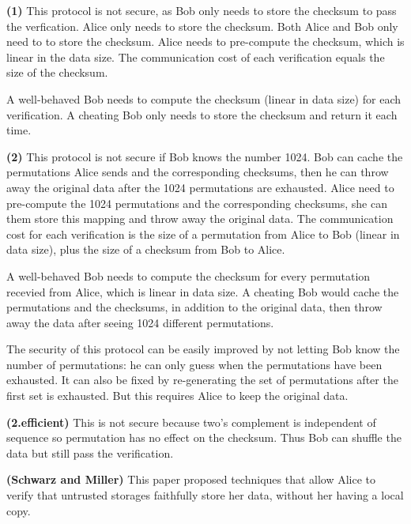 \documentclass[10pt]{article}
\renewcommand\part[1]{\vspace{.10in}\textbf{(#1)}}
\begin{document}
\part{1}
This protocol is not secure, as Bob only needs to store the checksum to pass the
verfication.
Alice only needs to store the checksum.
Both Alice and Bob only need to to store the checksum.
Alice needs to pre-compute the checksum, which is linear in the data size.
The communication cost of each verification equals the size of the checksum.

A well-behaved Bob needs to compute the checksum (linear in data size) for each
verification. A cheating Bob only needs to store the checksum and return it each
time.

\part{2}
This protocol is not secure if Bob knows the number 1024.
Bob can cache the permutations Alice sends and the corresponding
checksums, then he can throw away the original data after the 1024 permutations
are exhausted.
Alice need to pre-compute the 1024 permutations and the corresponding checksums,
she can them store this mapping and throw away the original data.
The communication cost for each verification is the size of a permutation from
Alice to Bob (linear in data size), plus the size of a checksum from Bob to
Alice.

A well-behaved Bob needs to compute the checksum for every permutation recevied
from Alice, which is linear in data size.
A cheating Bob would cache the permutations and the checksums, in addition to
the original data, then throw away the data after seeing 1024 different
permutations.

The security of this protocol can be easily improved by not letting Bob know the
number of permutations: he can only guess when the permutations have been
exhausted. It can also be fixed by re-generating the set of permutations after
the first set is exhausted. But this requires Alice to keep the original data.

\part{2.efficient}
This is not secure because two's complement is independent of sequence so
permutation has no effect on the checksum. Thus Bob can shuffle the data but
still pass the verification.

\part{Schwarz and Miller}
This paper proposed techniques that allow Alice to verify that untrusted
storages faithfully store her data, without her having a local copy.
\end{document}
